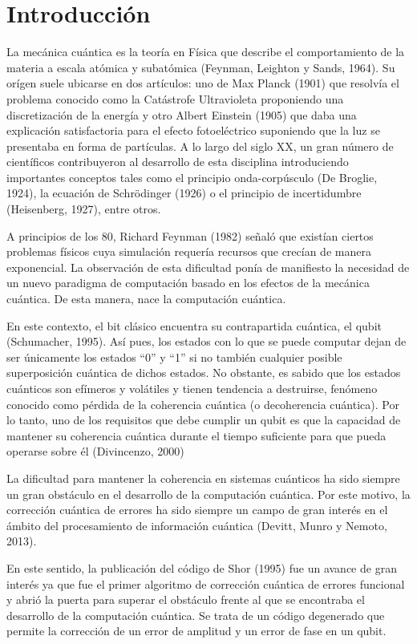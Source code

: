 \chapter{Introducción}

La mecánica cuántica es la teoría en Física que describe el comportamiento de la materia a escala atómica y subatómica (Feynman, Leighton y Sands, 1964). Su orígen suele ubicarse en dos artículos: uno de Max Planck (1901) que resolvía el problema conocido como la Catástrofe Ultravioleta proponiendo una discretización de la energía y otro Albert Einstein (1905) que daba una explicación satisfactoria para el efecto fotoeléctrico suponiendo que la luz se presentaba en forma de partículas. A lo largo del siglo XX, un gran número de científicos contribuyeron al desarrollo de esta disciplina introduciendo importantes conceptos tales como el principio onda-corpúsculo (De Broglie, 1924), la ecuación de Schrödinger (1926) o el principio de incertidumbre (Heisenberg, 1927), entre otros. 

A principios de los 80, Richard Feynman (1982) señaló que existían ciertos problemas físicos cuya simulación requería recursos que crecían de manera exponencial. La observación de esta dificultad ponía de manifiesto la necesidad de un nuevo paradigma de computación basado en los efectos de la mecánica cuántica. De esta manera, nace la computación cuántica.

En este contexto, el bit clásico encuentra su contrapartida cuántica, el qubit (Schumacher, 1995). Así pues, los estados con lo que se puede computar dejan de ser únicamente los estados “0” y “1” si no también cualquier posible superposición cuántica de dichos estados. No obstante, es sabido que los estados cuánticos son efímeros y volátiles y tienen tendencia a destruirse, fenómeno conocido como pérdida de la coherencia cuántica (o decoherencia cuántica). Por lo tanto, uno de los requisitos que debe cumplir un qubit es que la capacidad de mantener su coherencia cuántica durante el tiempo suficiente para que pueda operarse sobre él (Divincenzo, 2000)


La dificultad para mantener la coherencia en sistemas cuánticos ha sido siempre un gran obstáculo en el desarrollo de la computación cuántica. Por este motivo, la corrección cuántica de errores ha sido siempre un campo de gran interés en el ámbito del procesamiento de información cuántica (Devitt, Munro y Nemoto, 2013). 

En este sentido, la publicación del código de Shor (1995) fue un avance de gran interés ya que fue el primer algoritmo de corrección cuántica de errores funcional y abrió la puerta para superar el obstáculo frente al que se encontraba el desarrollo de la computación cuántica. Se trata de un código degenerado que permite la corrección de un error de amplitud y un error de fase en un qubit.

